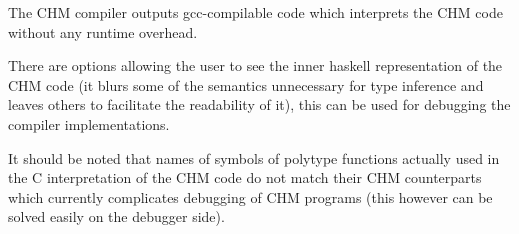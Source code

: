 The CHM compiler outputs gcc-compilable code which interprets the CHM code without any runtime overhead. %

There are options allowing the user to see the inner haskell representation of the CHM code (it blurs some of the semantics unnecessary for type inference and leaves others to facilitate the readability of it), this can be used for debugging the compiler implementations. %

It should be noted that names of symbols of polytype functions actually used in the C interpretation of the CHM code do not match their CHM counterparts which currently complicates debugging of CHM programs (this however can be solved easily on the debugger side).

